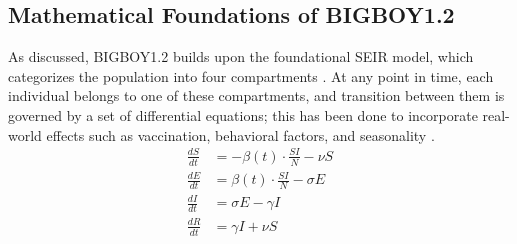 \documentclass[11pt,a4paper]{article}
\theoremstyle{remark}\newtheorem{remark}{Remark}
\begin{document}
\subsection{Mathematical Foundations of BIGBOY1.2}
As discussed, BIGBOY1.2 builds upon the foundational SEIR model, which categorizes the population into four compartments \cite{hethcote}. At any point in time, each individual belongs to one of these compartments, and transition between them is governed by a set of differential equations; this has been done to incorporate real-world effects such as vaccination, behavioral factors, and seasonality \cite{bubar2021model, neipel2020seasonal}. \\
\begin{equation} \label{eq:SEIR Fundamental}
\begin{aligned}
    \frac{dS}{dt} &= -\beta(t) \cdot \frac{SI}{N} - \nu S \\
    \frac{dE}{dt} &= \beta(t) \cdot \frac{SI}{N} - \sigma E \\
    \frac{dI}{dt} &= \sigma E - \gamma I \\
    \frac{dR}{dt} &= \gamma I + \nu S
\end{aligned}
\end{equation}
\end{document}
